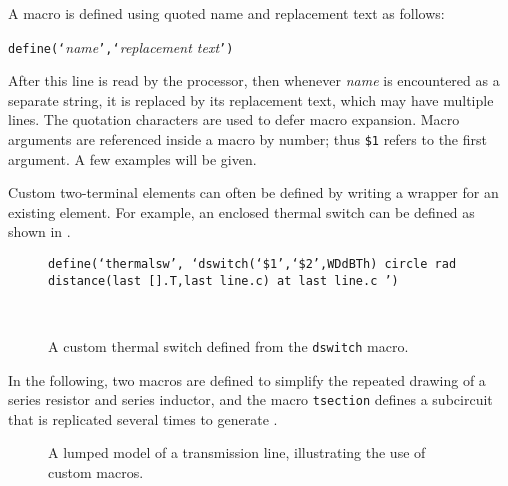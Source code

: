 A macro is defined using quoted name and replacement text as follows:

{\tt define(`}{\sl name}{\tt',`}{\sl replacement text}{\tt ')}

After this line is read by the \Mfour processor, then whenever {\sl name}
is encountered as a separate string, it is replaced by its replacement
text, which may have multiple lines.  The quotation characters are used
to defer macro expansion.  Macro arguments are referenced inside a
macro by number; thus {\tt \$1} refers to the first argument.
A few examples will be given.

Custom two-terminal elements can often be defined by writing a wrapper
for an existing element.  For example, an enclosed thermal switch
can be defined as shown in .
\begin{figure}[H]
   \parbox{5in}{\tt define(`thermalsw',\hfill\break
   \hbox{}\space`dswitch(`\$1',`\$2',WDdBTh)\hfill\break
   \hbox{}\space\space circle rad distance(last [].T,last line.c)
     at last line.c ') }%
   \hfill\raise-0.15in\hbox{ }
   \caption{A custom thermal switch defined from the {\tt dswitch} macro.}
   \label{Thermal}
   \end{figure}

\pagebreak
{}
In the following,
two macros are defined to simplify the repeated drawing
of a series resistor and series inductor, and the macro {\tt tsection} defines
a subcircuit that is replicated several times to generate .

{\small }
\begin{figure}[H]
   
   \caption{A lumped model of a transmission line, illustrating the
    use of custom macros.}
   \label{Tline}
   \end{figure}

